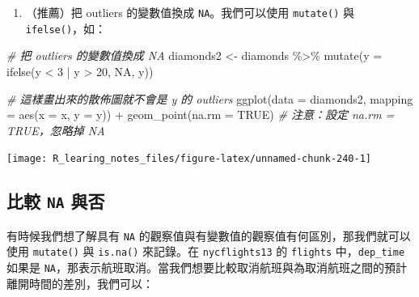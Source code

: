 \documentclass[
]{book}
\newenvironment{Shaded}{\begin{snugshade}}{\end{snugshade}}
\newcommand{\AttributeTok}[1]{\textcolor[rgb]{0.77,0.63,0.00}{#1}}
\newcommand{\CommentTok}[1]{\textcolor[rgb]{0.56,0.35,0.01}{\textit{#1}}}
\newcommand{\ConstantTok}[1]{\textcolor[rgb]{0.00,0.00,0.00}{#1}}
\newcommand{\DecValTok}[1]{\textcolor[rgb]{0.00,0.00,0.81}{#1}}
\newcommand{\FunctionTok}[1]{\textcolor[rgb]{0.00,0.00,0.00}{#1}}
\newcommand{\NormalTok}[1]{#1}
\newcommand{\OtherTok}[1]{\textcolor[rgb]{0.56,0.35,0.01}{#1}}
\newcommand{\SpecialCharTok}[1]{\textcolor[rgb]{0.00,0.00,0.00}{#1}}
\providecommand{\tightlist}{%
  \setlength{\itemsep}{0pt}\setlength{\parskip}{0pt}}
\theoremstyle{definition}
\theoremstyle{remark}
\begin{document}
\begin{enumerate}
\def\labelenumi{\arabic{enumi}.}
\setcounter{enumi}{1}
\tightlist
\item
  （推薦）把 outliers 的變數值換成 \texttt{NA}。我們可以使用 \texttt{mutate()} 與 \texttt{ifelse()}，如：
\end{enumerate}

\begin{Shaded}
\begin{Highlighting}[]
\CommentTok{\# 把 outliers 的變數值換成 NA}
\NormalTok{diamonds2 }\OtherTok{\textless{}{-}}\NormalTok{ diamonds }\SpecialCharTok{\%\textgreater{}\%}
  \FunctionTok{mutate}\NormalTok{(}\AttributeTok{y =} \FunctionTok{ifelse}\NormalTok{(y }\SpecialCharTok{\textless{}} \DecValTok{3} \SpecialCharTok{|}\NormalTok{ y }\SpecialCharTok{\textgreater{}} \DecValTok{20}\NormalTok{, }\ConstantTok{NA}\NormalTok{, y))}
\end{Highlighting}
\end{Shaded}

\begin{Shaded}
\begin{Highlighting}[]
\CommentTok{\# 這樣畫出來的散佈圖就不會是 y 的 outliers}
\FunctionTok{ggplot}\NormalTok{(}\AttributeTok{data =}\NormalTok{ diamonds2, }\AttributeTok{mapping =} \FunctionTok{aes}\NormalTok{(}\AttributeTok{x =}\NormalTok{ x, }\AttributeTok{y =}\NormalTok{ y)) }\SpecialCharTok{+}
  \FunctionTok{geom\_point}\NormalTok{(}\AttributeTok{na.rm =} \ConstantTok{TRUE}\NormalTok{)  }\CommentTok{\# 注意：設定 na.rm = TRUE，忽略掉 NA}
\end{Highlighting}
\end{Shaded}

\begin{center}\texttt{[image: R\_learing\_notes\_files/figure-latex/unnamed-chunk-240-1]} \end{center}

\hypertarget{ux6bd4ux8f03-na-ux8207ux5426}{%
\subsection{\texorpdfstring{比較 \texttt{NA} 與否}{比較 NA 與否}}\label{ux6bd4ux8f03-na-ux8207ux5426}}

有時候我們想了解具有 \texttt{NA} 的觀察值與有變數值的觀察值有何區別，那我們就可以使用 \texttt{mutate()} 與 \texttt{is.na()} 來記錄。在 \texttt{nycflights13} 的 \texttt{flights} 中，\texttt{dep\_time} 如果是 \texttt{NA}，那表示航班取消。當我們想要比較取消航班與為取消航班之間的預計離開時間的差別，我們可以：
\end{document}
